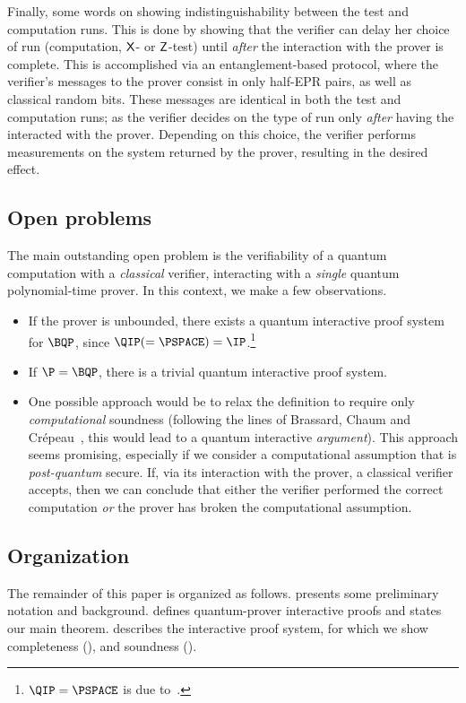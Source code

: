 \documentclass{toc}
\newcommand{\xgate}{{\sf X}}
\newcommand{\zgate}{{\sf Z}}
\begin{document}
Finally, some words on showing indistinguishability between the test and computation runs. This is done by showing that the verifier can delay her choice of  run (computation, $\xgate$- or $\zgate$-test) until \emph{after} the interaction with the prover is complete. This is accomplished via an entanglement-based protocol, where the verifier's messages to the prover consist in only half-EPR pairs, as well as classical random bits. These messages are identical in both the test and computation runs; as the verifier decides on the type of run only \emph{after} having the interacted with the prover. Depending on this choice, the verifier performs measurements on the system returned by the prover, resulting in the desired effect.




\subsection{Open problems}
The main outstanding open problem is the verifiability of a quantum computation with a  \emph{classical} verifier, interacting with a \emph{single} quantum polynomial-time prover. In this context, we
%
make   %
a few
observations. %
\begin{itemize}
\item  If the prover is unbounded, there exists a quantum interactive proof system for $\BQP$, since
$\QIP (=\PSPACE) =\IP$.\footnote{$\QIP =\PSPACE$ is due to~\cite{JJUW10}.}
\item  If $\P= \BQP$, there is a trivial quantum interactive proof system.
\item  One possible approach would be to relax the definition to require only \emph{computational} soundness (following the lines of Brassard, Chaum and Cr\'epeau~\cite{BCC88}, this would lead to a quantum interactive \emph{argument}). This approach seems promising, especially if we consider a computational assumption that is \emph{post-quantum} secure. If, via its interaction with the prover, a classical verifier accepts, then we can conclude that either the verifier performed the correct computation \emph{or} the prover has broken the computational assumption.
\end{itemize}



\subsection{Organization}
The remainder of this paper is organized as follows.  presents some preliminary notation and background.   defines quantum-prover interactive proofs and states our main theorem.  describes the interactive proof system, for which we show completeness (), and soundness ().
\end{document}
